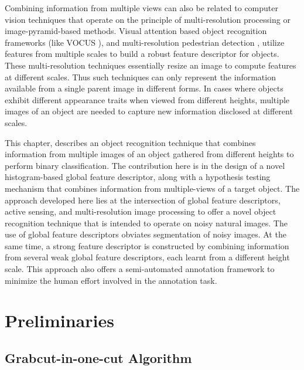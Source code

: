 \documentclass {udthesis}
\begin{document}
Combining information from multiple views can also be related to computer vision techniques that operate on the principle of multi-resolution processing or image-pyramid-based methods. Visual attention based object recognition frameworks (like VOCUS \cite{frintrop}), and multi-resolution pedestrian detection \cite{park}, utilize features from multiple scales to build a robust feature descriptor for objects. These multi-resolution techniques essentially resize an image to compute features at different scales. Thus such techniques can only represent the information available from a single parent image in different forms. In cases where objects exhibit different appearance traits when viewed from different heights, multiple images of an object are needed to capture new information disclosed at different scales.

This chapter, describes an object recognition technique that combines information from multiple images of an object gathered from different heights to perform binary classification. The contribution here is in the design of a novel histogram-based global feature descriptor, along with a hypothesis testing mechanism that combines information from multiple-views of a target object. The approach developed here lies at the intersection of global feature descriptors, active sensing, and multi-resolution image processing to offer a novel object recognition technique that is intended to operate on noisy natural images. The use of global feature descriptors obviates segmentation of noisy images. At the same time, a strong feature descriptor is constructed by combining information from several weak global feature descriptors, each learnt from a different height scale. This approach also offers a semi-automated annotation framework to minimize the human effort involved in the annotation task.

\section{Preliminaries}

\subsection{Grabcut-in-one-cut Algorithm}
\label{sec:onecut}
\end{document}
